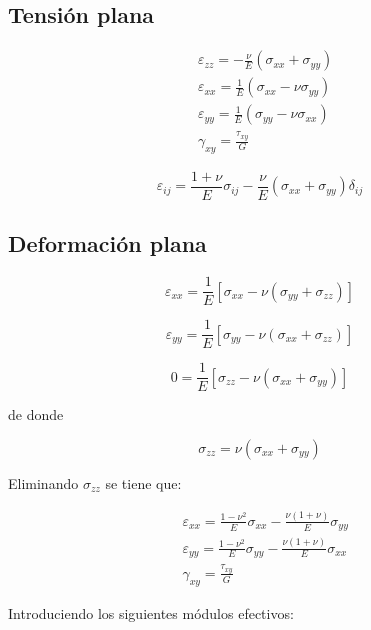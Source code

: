 \documentclass[../notas medios.tex]{subfiles}
\begin{document}
\subsection{Tensión plana}

\begin{equation} \label{platension}
\begin{split}
& \varepsilon_{zz} =  - \frac{\nu }{E}(\sigma_{xx} + \sigma_{yy}) \\
& \varepsilon_{xx} =    \frac{1}{E}(\sigma_{xx} - \nu \sigma_{yy})\\ 
& \varepsilon_{yy} = \frac{1}{E}(\sigma_{yy} - \nu \sigma_{xx})\\
& \gamma_{xy} = \frac{\tau_{xy}}{G}
\end{split}
\end{equation}

\[\varepsilon_{ij} = \frac{1 + \nu}{E} \sigma_{ij} - \frac{\nu}{E}(\sigma_{xx} + \sigma_{yy}) \delta_{ij}\]


\subsection{Deformación plana}

\[{\varepsilon _{xx}} = \frac{1}{E}\left[ {{\sigma _{xx}} - \nu ({\sigma _{yy}} + {\sigma _{zz}})} \right]\]

\[{\varepsilon _{yy}} = \frac{1}{E}\left[ {{\sigma _{yy}} - \nu ({\sigma _{xx}} + {\sigma _{zz}})} \right]\]

\[0 = \frac{1}{E}\left[ {{\sigma _{zz}} - \nu ({\sigma _{xx}} + {\sigma _{yy}})} \right]\]

de donde

\[{\sigma _{zz}} = \nu ({\sigma _{xx}} + {\sigma _{yy}})\]

Eliminando $\sigma _{zz}$ se tiene que:

\begin{equation} \label{plastrain}
\begin{split}
& {\varepsilon _{xx}} = \frac{{1 - {\nu ^2}}}{E}{\sigma _{xx}} - \frac{{\nu (1 + \nu )}}{E}{\sigma _{yy}} \\
& {\varepsilon _{yy}} = \frac{{1 - {\nu ^2}}}{E}{\sigma _{yy}} - \frac{{\nu (1 + \nu )}}{E}{\sigma _{xx}} \\ 
& {\gamma _{xy}} = \frac{{{\tau _{xy}}}}{G}
\end{split}
\end{equation}

Introduciendo los siguientes módulos efectivos:
\end{document}
